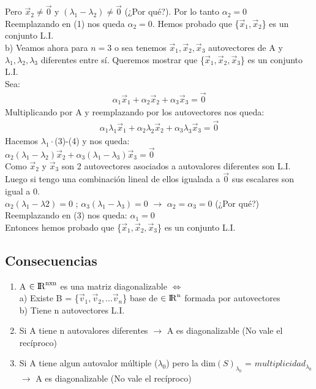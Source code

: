 \documentclass[11pt]{article}
\begin{document}
Pero $\vec{x}_2 \neq \vec{0}$ y $(\lambda_1 - \lambda_2) \neq \vec{0}$ (¿Por qué?). Por lo tanto $\alpha_2=0$\\
Reemplazando en (1) nos queda $\alpha_2=0$. Hemos probado que \{$\vec{x}_{1}, \vec{x}_2$\} es un conjunto L.I. \\
b) Veamos ahora para $n=3$ o sea tenemos $\vec{x}_{1}, \vec{x}_2, \vec{x}_3$ autovectores de A y $\lambda_1, \lambda_2, \lambda_3$ diferentes entre sí. Queremos mostrar que \{$\vec{x}_{1}, \vec{x}_2, \vec{x}_3$\} es un conjunto L.I.\\
Sea: 
\begin{align}
\alpha_1\vec{x}_1+\alpha_2\vec{x}_2+\alpha_3\vec{x}_3 = \vec{0}
\end{align}
Multiplicando por A y reemplazando por los autovectores nos queda:
\begin{align}
\alpha_{1}\lambda_1\vec{x}_1+\alpha_{2}\lambda_2\vec{x}_2 + \alpha_{3}\lambda_3\vec{x}_3 = \vec{0}
\end{align}
Hacemos $\lambda_1\cdot$(3)-(4) y nos queda: \\$\alpha_2(\lambda_1-\lambda_2)\vec{x}_2+\alpha_3(\lambda_1-\lambda_3)\vec{x}_3=\vec{0}$ \\
Como $\vec{x}_2$ y $\vec{x}_3$ son 2 autovectores asociados a autovalores diferentes son L.I. Luego si tengo una combinación lineal de ellos igualada a $\vec{0}$ sus escalares son igual a 0.\\
$\alpha_2(\lambda_1-\lambda2)=0$ ; $\alpha_3(\lambda_1-\lambda_3)=0$ $\rightarrow$ $\alpha_2 = \alpha_3 = 0$ (¿Por qué?)\\
Reemplazando en (3) nos queda: $\alpha_1=0$\\
Entonces hemos probado que \{$\vec{x}_{1}, \vec{x}_2, \vec{x}_3$\} es un conjunto L.I.
\subsection{Consecuencias}
\begin{enumerate}
\item A $\in \rm {I\!R}^{nxn}$ es una matriz diagonalizable $\Leftrightarrow$ \\
a) Existe B = \{$\vec{v}_{1}, \vec{v}_2,... \vec{v}_n $\} base de $\in \rm {I\!R}^{n}$ formada por autovectores \\
b) Tiene n autovectores L.I.
\item Si A tiene n autovalores diferentes $\rightarrow$ A es diagonalizable (No vale el recíproco)
\item Si A tiene algun autovalor múltiple ($\lambda_0$) pero la dim$(S)_{\lambda_0}$ = $multiplicidad_{\lambda_0}$ $\rightarrow $ A es diagonalizable (No vale el recíproco)
\end{enumerate}
\end{document}
